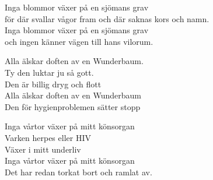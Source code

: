 \vspace{10pt}
Inga blommor växer på en sjömans grav\\
för där svallar vågor fram och där saknas kors och namn.\\ 
Inga blommor växer på en sjömans grav \\
och ingen känner vägen till hans vilorum.\par
\vspace{10pt}
Alla älskar doften av en Wunderbaum.\\
Ty den luktar ju så gott.\\
Den är billig dryg och flott\\
Alla älskar doften av en Wunderbaum\\
Den för hygienproblemen sätter stopp\par
\vspace{10pt}
Inga vårtor växer på mitt könsorgan\\
Varken herpes eller HIV\\
Växer i mitt underliv\\
Inga vårtor växer på mitt könsorgan\\
Det har redan torkat bort och ramlat av.
